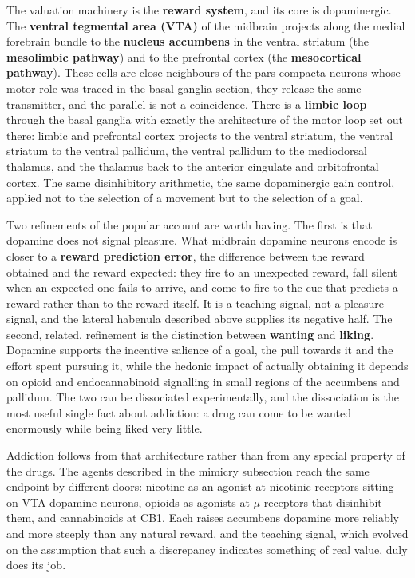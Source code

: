\documentclass[11pt]{article}
\begin{document}
The valuation machinery is the \textbf{reward system}, and its core is dopaminergic. The \textbf{ventral tegmental area (VTA)} of the midbrain projects along the medial forebrain bundle to the \textbf{nucleus accumbens} in the ventral striatum (the \textbf{mesolimbic pathway}) and to the prefrontal cortex (the \textbf{mesocortical pathway}). These cells are close neighbours of the pars compacta neurons whose motor role was traced in the basal ganglia section, they release the same transmitter, and the parallel is not a coincidence. There is a \textbf{limbic loop} through the basal ganglia with exactly the architecture of the motor loop set out there: limbic and prefrontal cortex projects to the ventral striatum, the ventral striatum to the ventral pallidum, the ventral pallidum to the mediodorsal thalamus, and the thalamus back to the anterior cingulate and orbitofrontal cortex. The same disinhibitory arithmetic, the same dopaminergic gain control, applied not to the selection of a movement but to the selection of a goal.

Two refinements of the popular account are worth having. The first is that dopamine does not signal pleasure. What midbrain dopamine neurons encode is closer to a \textbf{reward prediction error}, the difference between the reward obtained and the reward expected: they fire to an unexpected reward, fall silent when an expected one fails to arrive, and come to fire to the cue that predicts a reward rather than to the reward itself. It is a teaching signal, not a pleasure signal, and the lateral habenula described above supplies its negative half. The second, related, refinement is the distinction between \textbf{wanting} and \textbf{liking}. Dopamine supports the incentive salience of a goal, the pull towards it and the effort spent pursuing it, while the hedonic impact of actually obtaining it depends on opioid and endocannabinoid signalling in small regions of the accumbens and pallidum. The two can be dissociated experimentally, and the dissociation is the most useful single fact about addiction: a drug can come to be wanted enormously while being liked very little.

Addiction follows from that architecture rather than from any special property of the drugs. The agents described in the mimicry subsection reach the same endpoint by different doors: nicotine as an agonist at nicotinic receptors sitting on VTA dopamine neurons, opioids as agonists at $\mu$ receptors that disinhibit them, and cannabinoids at CB1. Each raises accumbens dopamine more reliably and more steeply than any natural reward, and the teaching signal, which evolved on the assumption that such a discrepancy indicates something of real value, duly does its job.
\end{document}

